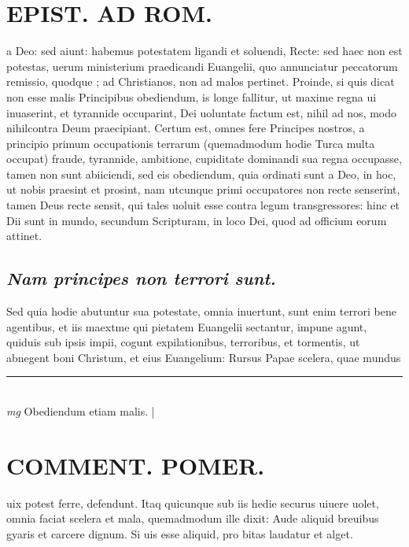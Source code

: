 \documentclass{article}
\begin{document}
\begin{pages}
\section*{EPIST. AD ROM.  }
\marginpar{[ p.150 ]}\pstart a Deo: sed aiunt: habemus potestatem ligandi et soluendi, Recte: sed haec non est potestas, uerum ministerium praedicandi Euangelii, quo annunciatur peccatorum remissio, quodque ; ad Christianos, non ad malos pertinet. Proinde, si quis dicat non esse malis Principibus obediendum, is longe fallitur, ut maxime regna ui inuaserint, et tyrannide occuparint, Dei uoluntate factum est, nihil ad nos, modo nihilcontra Deum praecipiant. Certum est, omnes fere Principes nostros, a principio primum occupationis terrarum (quemadmodum hodie Turca multa occupat) fraude, tyrannide, ambitione, cupiditate dominandi sua regna occupasse, tamen non sunt abiiciendi, sed eis obediendum, quia ordinati sunt a Deo, in hoc, ut nobis praesint et prosint, nam utcunque primi occupatores non recte senserint, tamen Deus recte sensit, qui tales uoluit esse contra legum transgressores: hinc et Dii sunt in mundo, secundum Scripturam, in loco Dei, quod ad officium eorum attinet.  \pend
{}
{}
\subsection*{\textit{Nam principes non terrori sunt. }}\pstart Sed quia hodie abutuntur sua potestate, omnia inuertunt, sunt enim terrori bene agentibus, et iis maextme qui pietatem Euangelii sectantur, impune agunt, quiduis sub ipsis impii, cogunt expilationibus, terroribus, et tormentis, ut abnegent boni Christum, et eius Euangelium: Rursus Papae scelera, quae mundus  \pend
\vspace{0.5cm}\noindent
\vspace{0.2cm}\rule{1cm}{0.2pt}\\ 
\hspace{0.2cm}\textit{mg}
\footnotesize Obediendum etiam malis. 
\normalsize| 
\section*{COMMENT. POMER.  }\pstart uix potest ferre, defendunt. Itaq quicunque sub iis hedie securus uiuere uolet, omnia faciat scelera et mala, quemadmodum ille dixit: Aude aliquid breuibus gyaris et carcere dignum. Si uis esse aliquid, pro bitas laudatur et alget.  \pend
{}
{}

\end{pages}
\end{document}
